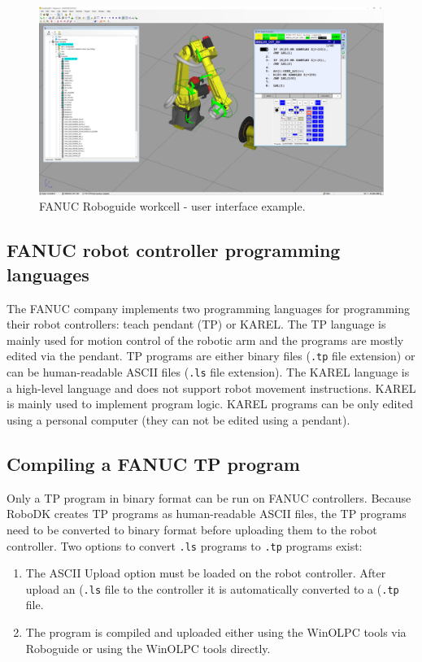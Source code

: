 \begin{figure}[h]
    \centering
    \includegraphics[width=0.9\linewidth]{img/roboguide.PNG}
    \caption{FANUC Roboguide workcell - user interface example.}
    \label{fig:roboguide}
\end{figure}

\subsection{FANUC robot controller programming languages}

The FANUC company implements two programming languages for programming their robot controllers: teach pendant (TP) or KAREL. The TP language is mainly used for motion control of the robotic arm and the programs are mostly edited via the pendant. TP programs are either binary files (\texttt{.tp} file extension) or can be human-readable ASCII files (\texttt{.ls} file extension). The KAREL language is a high-level language and does not support robot movement instructions. KAREL is mainly used to implement program logic. KAREL programs can be only edited using a personal computer (they can not be edited using a pendant).

\subsection{Compiling a FANUC TP program}

Only a TP program in binary format can be run on FANUC controllers. Because RoboDK creates TP programs as human-readable ASCII files, the TP programs need to be converted to binary format before uploading them to the robot controller. Two options to convert \texttt{.ls} programs to \texttt{.tp} programs exist:

\begin{enumerate}
\item The ASCII Upload option must be loaded on the robot controller. After upload an (\texttt{.ls} file to the controller it is automatically converted to a (\texttt{.tp} file.
\item The program is compiled and uploaded either using the WinOLPC  tools via Roboguide or using the WinOLPC tools directly.

\end{enumerate}

